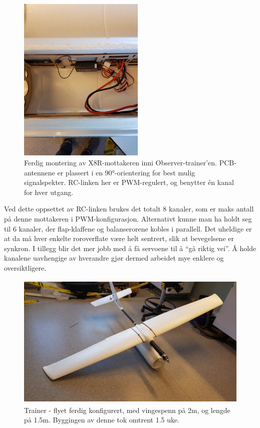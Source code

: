 \documentclass[12pt, a4paper]{article}
\begin{document}
\begin{figure}[ht]
	\centering
	\includegraphics[height=8cm, width = .6\textwidth]{bilder/mottakermontering.jpg}
	\caption[Mottaker-montering]{Ferdig montering av X8R-mottakeren inni Observer-trainer'en. PCB-antennene er plassert i en \ang{90}-orientering for best mulig signalspekter. RC-linken her er PWM-regulert, og benytter én kanal for hver utgang.}
\end{figure}
\newpage

Ved dette oppsettet av RC-linken brukes det totalt 8 kanaler, som er maks antall på denne mottakeren i PWM-konfigurasjon. Alternativt kunne man ha holdt seg til 6 kanaler, der flap-klaffene og balanserorene kobles i parallell. Det uheldige er at da må hver enkelte roroverflate være helt sentrert, slik at bevegelsene er synkron. I tillegg blir det mer jobb med å få servoene til å ``gå riktig vei''. Å holde kanalene uavhengige av hverandre gjør dermed arbeidet mye enklere og oversiktligere. 

\begin{figure}[ht]
	\centering
	\includegraphics[width=.6\textwidth, height = 6.5cm]{bilder/forste_fly_ferdigstilt.jpg}
	\caption[Trainer-fly]{Trainer - flyet ferdig konfigurert, med vingespenn på 2m, og lengde på 1.5m. Byggingen av denne tok omtrent 1.5 uke. }
\end{figure}
\end{document}

